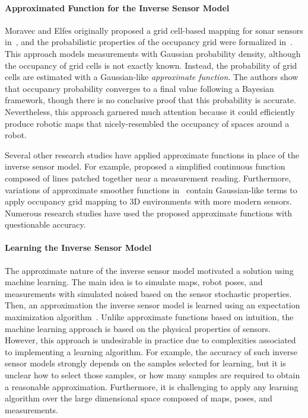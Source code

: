 \paragraph{Approximated Function for the Inverse Sensor Model} Moravec and Elfes originally proposed a grid cell-based mapping for sonar sensors in~\cite{MorElf85}, and the probabilistic properties of the occupancy grid were formalized in~\cite{MorElf85,Elf89}. This approach models measurements with Gaussian probability density, although the occupancy of grid cells is not exactly known. Instead, the probability of grid cells are estimated with a Gaussian-like \emph{approximate function}. The authors show that occupancy probability converges to a final value following a Bayesian framework, though there is no conclusive proof that this probability is accurate. Nevertheless, this approach garnered much attention because it could efficiently produce robotic maps that nicely-resembled the occupancy of spaces around a robot.

Several other research studies have applied approximate functions in place of the inverse sensor model. For example, \cite{ChoLynHutKanBurKavThr05} proposed a simplified continuous function composed of lines patched together near a measurement reading. Furthermore, variations of approximate smoother functions in~\cite{Andert09,PirRutBisSch11,KhoElb12} contain Gaussian-like terms to apply occupancy grid mapping to 3D environments with more modern sensors. Numerous research studies have used the proposed approximate functions with questionable accuracy.

\paragraph{Learning the Inverse Sensor Model} The approximate nature of the inverse sensor model motivated a solution using machine learning. The main idea is to simulate maps, robot poses, and measurements with simulated noised based on the sensor stochastic properties. Then, an approximation the inverse sensor model is learned using an expectation maximization algorithm~\cite{Thr01,ThrBurFox05}. Unlike approximate functions based on intuition, the machine learning approach is based on the physical properties of sensors. However, this approach is undesirable in practice due to complexities associated to implementing a learning algorithm. For example, the accuracy of such inverse sensor models strongly depends on the samples selected for learning, but it is unclear how to select those samples, or how many samples are required to obtain a reasonable approximation. Furthermore, it is challenging to apply any learning algorithm over the large dimensional space composed of maps, poses, and measurements.

